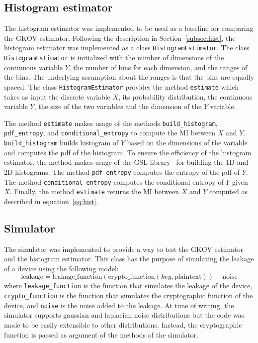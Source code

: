 \documentclass[12pt]{article}
\begin{document}
    \subsection{Histogram estimator}\label{subsec:hist_impl}
    The histogram estimator was implemented to be used as a baseline for comparing the GKOV estimator.
    Following the description in Section~\ref{subsec:hist}, the histogram estimator was implemented as a class \texttt{HistogramEstimator}.
    The class \texttt{HistogramEstimator} is initialized with the number of dimensions of the continuous variable $Y$, the number of bins for each dimension, and the ranges of the bins.
    The underlying assumption about the ranges is that the bins are equally spaced.
    The class \texttt{HistogramEstimator} provides the method \texttt{estimate} which takes as input the discrete variable $X$, its probability distribution, the continuous variable $Y$, the size of the two variables and the dimension of the $Y$ variable.

    The method \texttt{estimate} makes usage of the methods \texttt{build\_histogram}, \texttt{pdf\_entropy}, and \texttt{conditional\_entropy} to compute the MI between $X$ and $Y$.
    \texttt{build\_histogram} builds histogram of $Y$ based on the dimensions of the variable and computes the pdf of the histogram.
    To ensure the efficiency of the histogram estimator, the method makes usage of the GSL library~\cite{gsl} for building the 1D and 2D histograms.
    The method \texttt{pdf\_entropy} computes the entropy of the pdf of $Y$.
    The method \texttt{conditional\_entropy} computes the conditional entropy of $Y$ given $X$.
    Finally, the method \texttt{estimate} returns the MI between $X$ and $Y$ computed as described in equation~\ref{eq:hist}.

    \subsection{Simulator}\label{subsec:sim}
    The simulator was implemented to provide a way to test the GKOV estimator and the histogram estimator.
    This class has the purpose of simulating the leakage of a device using the following model:
    \begin{equation}
        \text{leakage} = \text{leakage\_function}(\text{crypto\_function}(key, \text{plaintext})) + \text{noise}\label{eq:sim}
    \end{equation}
    where \texttt{leakage\_function} is the function that simulates the leakage of the device, \texttt{crypto\_function} is the function that simulates the cryptographic function of the device, and \texttt{noise} is the noise added to the leakage.
    At time of writing, the simulator supports gaussian and laplacian noise distributions but the code was made to be easily extensible to other distributions.
    Instead, the cryptographic function is passed as argument of the methods of the simulator.
\end{document}
